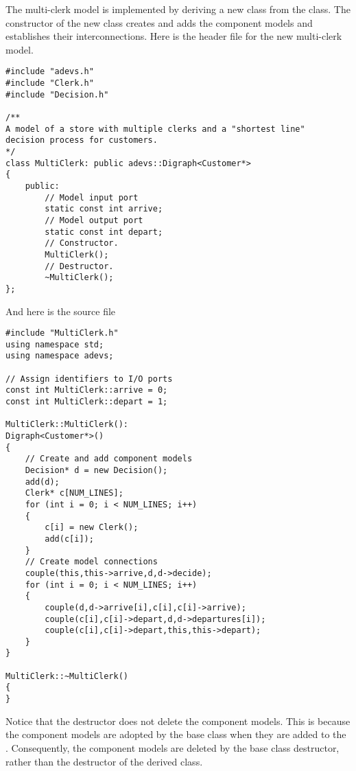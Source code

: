 The multi-clerk model is implemented by deriving a new class from
the  class. The constructor of the new class creates
and adds the component models and establishes their interconnections.
Here is the header file for the new
multi-clerk model.
\begin{verbatim}
#include "adevs.h"
#include "Clerk.h"
#include "Decision.h"

/**
A model of a store with multiple clerks and a "shortest line"
decision process for customers.
*/
class MultiClerk: public adevs::Digraph<Customer*>
{
    public:
        // Model input port
        static const int arrive;
        // Model output port
        static const int depart;
        // Constructor.
        MultiClerk();
        // Destructor.
        ~MultiClerk();
};
\end{verbatim}
And here is the source file
\begin{verbatim}
#include "MultiClerk.h"
using namespace std;
using namespace adevs;

// Assign identifiers to I/O ports
const int MultiClerk::arrive = 0;
const int MultiClerk::depart = 1;

MultiClerk::MultiClerk():
Digraph<Customer*>()
{
    // Create and add component models
    Decision* d = new Decision();
    add(d);
    Clerk* c[NUM_LINES];
    for (int i = 0; i < NUM_LINES; i++)
    {
        c[i] = new Clerk();
        add(c[i]);
    }
    // Create model connections
    couple(this,this->arrive,d,d->decide);
    for (int i = 0; i < NUM_LINES; i++)
    {
        couple(d,d->arrive[i],c[i],c[i]->arrive);
        couple(c[i],c[i]->depart,d,d->departures[i]);
        couple(c[i],c[i]->depart,this,this->depart);
    }
}

MultiClerk::~MultiClerk()
{
}
\end{verbatim}
Notice that the  destructor does not delete the component
models.  This is because the component models are adopted by the base
class when they are added to the . 
Consequently, the component models are deleted by the base class
destructor, rather than the destructor of the derived class.

